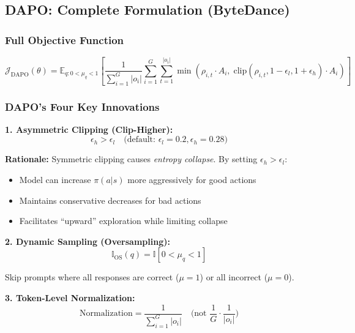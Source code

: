 \documentclass[11pt,a4paper]{article}
\begin{document}
\subsection{DAPO: Complete Formulation (ByteDance)}

\subsubsection{Full Objective Function}

\begin{equation}
\mathcal{J}_{\text{DAPO}}(\theta) = \mathbb{E}_{q: 0 < \mu_q < 1} \left[ \frac{1}{\sum_{i=1}^G |o_i|} \sum_{i=1}^{G} \sum_{t=1}^{|o_i|} \min\left( \rho_{i,t} \cdot A_i, \; \text{clip}(\rho_{i,t}, 1-\epsilon_l, 1+\epsilon_h) \cdot A_i \right) \right]
\end{equation}

\subsubsection{DAPO's Four Key Innovations}

\textbf{1. Asymmetric Clipping (Clip-Higher):}
\begin{equation}
\epsilon_h > \epsilon_l \quad \text{(default: } \epsilon_l = 0.2, \epsilon_h = 0.28\text{)}
\end{equation}

\begin{importantbox}
\textbf{Rationale:} Symmetric clipping causes \emph{entropy collapse}. By setting $\epsilon_h > \epsilon_l$:
\begin{itemize}
    \item Model can increase $\pi(a|s)$ more aggressively for good actions
    \item Maintains conservative decreases for bad actions
    \item Facilitates ``upward'' exploration while limiting collapse
\end{itemize}
\end{importantbox}

\textbf{2. Dynamic Sampling (Oversampling):}
\begin{equation}
\mathbb{I}_{\text{OS}}(q) = \mathbb{I}[0 < \mu_q < 1]
\end{equation}

Skip prompts where all responses are correct ($\mu = 1$) or all incorrect ($\mu = 0$).

\textbf{3. Token-Level Normalization:}
\begin{equation}
\text{Normalization} = \frac{1}{\sum_{i=1}^G |o_i|} \quad \text{(not } \frac{1}{G} \cdot \frac{1}{|o_i|}\text{)}
\end{equation}
\end{document}
